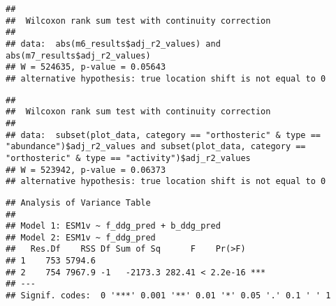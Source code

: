 \documentclass[
]{article}
\newenvironment{Shaded}{\begin{snugshade}}{\end{snugshade}}
\newcommand{\CommentTok}[1]{\textcolor[rgb]{0.56,0.35,0.01}{\textit{#1}}}
\newcommand{\FunctionTok}[1]{\textcolor[rgb]{0.13,0.29,0.53}{\textbf{#1}}}
\newcommand{\NormalTok}[1]{#1}
\newcommand{\SpecialCharTok}[1]{\textcolor[rgb]{0.81,0.36,0.00}{\textbf{#1}}}
\newcommand{\StringTok}[1]{\textcolor[rgb]{0.31,0.60,0.02}{#1}}
\begin{document}
\begin{verbatim}
## 
##  Wilcoxon rank sum test with continuity correction
## 
## data:  abs(m6_results$adj_r2_values) and abs(m7_results$adj_r2_values)
## W = 524635, p-value = 0.05643
## alternative hypothesis: true location shift is not equal to 0
\end{verbatim}

\begin{Shaded}
\end{Shaded}

\begin{verbatim}
## 
##  Wilcoxon rank sum test with continuity correction
## 
## data:  subset(plot_data, category == "orthosteric" & type == "abundance")$adj_r2_values and subset(plot_data, category == "orthosteric" & type == "activity")$adj_r2_values
## W = 523942, p-value = 0.06373
## alternative hypothesis: true location shift is not equal to 0
\end{verbatim}

\begin{Shaded}
\end{Shaded}

\begin{verbatim}
## Analysis of Variance Table
## 
## Model 1: ESM1v ~ f_ddg_pred + b_ddg_pred
## Model 2: ESM1v ~ f_ddg_pred
##   Res.Df    RSS Df Sum of Sq      F    Pr(>F)    
## 1    753 5794.6                                  
## 2    754 7967.9 -1   -2173.3 282.41 < 2.2e-16 ***
## ---
## Signif. codes:  0 '***' 0.001 '**' 0.01 '*' 0.05 '.' 0.1 ' ' 1
\end{verbatim}

\begin{Shaded}
\end{Shaded}
\end{document}
